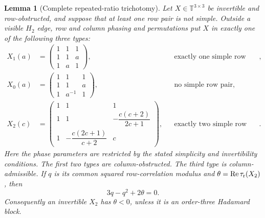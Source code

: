 \documentclass[aps,prx,reprint,nofootinbib,twoside,superscriptaddress,longbibliography,floatfix]{revtex4-2}
\newtheorem{lemma}[theorem]{Lemma}
\theoremstyle{definition}
\newcommand{\T}{\mathbb T}
\newcommand{\RePart}{\operatorname{Re}}
\begin{document}
\begin{lemma}[{Complete repeated-ratio trichotomy}]
\label{lem:supp-repeated-ratio-trichotomy}
{Let $X\in\T^{3\times3}$ be invertible and row-obstructed, and suppose that at least one row pair is not simple.  Outside a visible $H_2$ edge, row and column phasing and permutations put $X$ in exactly one of the following three types:}
\begin{align}
{X_1(a)}&{=\begin{pmatrix}1&1&1\\1&1&a\\1&a&1\end{pmatrix},}
&&{\text{exactly one simple row pair},}
\label{eq:supp-one-simple-normal-form}\\
{X_0(a)}&{=\begin{pmatrix}1&1&1\\1&1&a\\1&a^{-1}&1\end{pmatrix},}
&&{\text{no simple row pair},}
\label{eq:supp-no-simple-normal-form}\\
{X_2(c)}&{=\begin{pmatrix}
1&1&1\\
1&1&-\dfrac{c(c+2)}{2c+1}\\
1&-\dfrac{c(2c+1)}{c+2}&c
\end{pmatrix},}
&&{\text{exactly two simple row pairs}.}
\label{eq:supp-two-simple-normal-form}
\end{align}
{Here the phase parameters are restricted by the stated simplicity and invertibility conditions.  The first two types are column-obstructed.  The third type is column-admissible. If $q$ is its common squared row-correlation modulus and $\theta=\RePart\tau_{\rm r}(X_2)$, then}
\begin{equation}
{3q-q^2+2\theta=0.}
\label{eq:supp-two-simple-negative-invariant}
\end{equation}
{Consequently an invertible $X_2$ has $\theta<0$, unless it is an order-three Hadamard block.}
\end{lemma}
\end{document}
